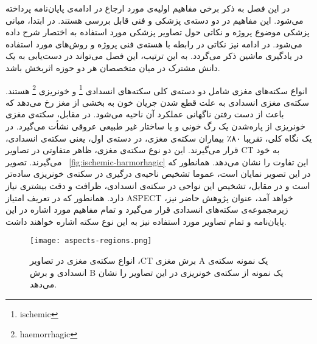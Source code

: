 



در این فصل به ذکر برخی مفاهیم اولیه‌ی مورد ارجاع در ادامه‌ی پایان‌نامه پرداخته می‌شود.
این مفاهیم در دو دسته‌ی پزشکی و فنی قابل بررسی هستند.
در ابتدا، مبانی پزشکی موضوع پروژه و نکاتی حول تصاویر پزشکی مورد استفاده به اختصار شرح داده می‌شود.
در ادامه نیز نکاتی در رابطه با هسته‌ی فنی پروژه و روش‌های مورد استفاده در یادگیری ماشین ذکر می‌گردد.
به این ترتیب، این فصل می‌تواند در دست‌یابی به یک دانش مشترک در میان متخصصان هر دو حوزه اثربخش باشد.



انواع سکته‌های مغزی شامل دو دسته‌ی کلی سکته‌های انسدادی
\footnote{ischemic}
و خونریزی
\footnote{haemorrhagic} 
هستند.
سکته‌ی مغزی انسدادی به علت قطع شدن جریان خون به بخشی از مغز رخ می‌دهد که باعث از دست رفتن ناگهانی عملکرد آن ناحیه می‌شود.
در مقابل، سکته‌ی مغزی خونریزی از پاره‌شدن یک رگ خونی و یا ساختار غیر طبیعی عروقی نشأت می‌گیرد.
در یک نگاه کلی، تقریبا ۸۰٪ بیماران سکته‌ی مغزی، در دسته‌ی اول، یعنی سکته‌ی انسدادی، قرار می‌گیرند.
این دو نوع سکته‌ی مغزی، ظاهر متفاوتی در تصاویر CT به خود می‌گیرند.
تصویر ~\ref{fig:ischemic-harmorhagic} این تفاوت را نشان می‌دهد.
همانطور که در این تصویر نمایان است، عموما تشخیص ناحیه‌ی درگیری
در سکته‌ی خونریزی ساده‌تر است و در مقابل، تشخیص این نواحی در سکته‌ی انسدادی، ظرافت و دقت بیشتری نیاز دارد.
همانطور که در تعریف امتیاز ASPECT خواهد آمد، عنوان پژوهش حاضر نیز، زیرمجموعه‌ی 
سکته‌های انسدادی قرار می‌گیرد و تمام مفاهیم مورد اشاره در این پایان‌نامه و تمام تصاویر مورد استفاده نیز به این نوع سکته اشاره خواهند داشت.

\begin{figure}[ht]
\centering
\texttt{[image: aspects-regions.png]}
\caption[]{انواع سکته‌ی مغزی در تصاویر ،CT برش مغزی A یک نمونه سکته‌ی انسدادی و برش B یک نمونه از سکته‌ی خونریزی در این تصاویر را نشان می‌دهد.}
\label{fig:ischemic-haemorrhagic}
\end{figure}
        

